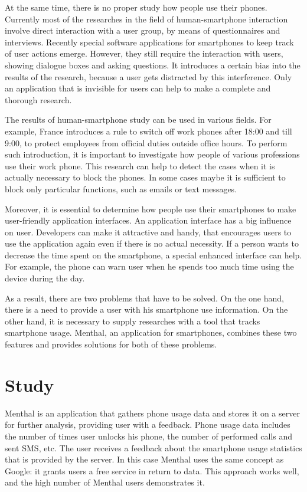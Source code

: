 At the same time, there is no proper study how people use their phones.
Currently most of the researches in the field of human-smartphone interaction involve direct interaction with a user group, by means of questionnaires and interviews.
Recently special software applications for smartphones to keep track of user actions emerge.
However, they still require the interaction with users, showing dialogue boxes and asking questions.
It introduces a certain bias into the results of the research, because a user gets distracted by this interference.
Only an application that is invisible for users can help to make a complete and thorough research.

The results of human-smartphone study can be used in various fields.
For example, France introduces a rule to switch off work phones after 18:00 and till 9:00, to protect employees from official duties outside office hours.
To perform such introduction, it is important to investigate how people of various professions use their work phone.
This research can help to detect the cases when it is actually necessary to block the phones.
In some cases maybe it is sufficient to block only particular functions, such as emails or text messages.

Moreover, it is essential to determine how people use their smartphones to make user-friendly application interfaces. 
An application interface has a big influence on user.
Developers can make it attractive and handy, that encourages users to use the application again even if there is no actual necessity.
If a person wants to decrease the time spent on the smartphone, a special enhanced interface can help.
For example, the phone can warn user when he spends too much time using the device during the day.  

As a result, there are two problems that have to be solved. 
On the one hand, there is a need to provide a user with his smartphone use information.
On the other hand, it is necessary to supply researches with a tool that tracks smartphone usage.
Menthal, an application for smartphones, combines these two features and provides solutions for both of these problems. 

\section{Study}
Menthal is an application that gathers phone usage data and stores it on a server for further analysis, providing user with a feedback.
Phone usage data includes the number of times user unlocks his phone, the number of performed calls and sent SMS, etc.
The user receives a feedback about the smartphone usage statistics that is provided by the server.
In this case Menthal uses the same concept as Google: it grants users a free service in return to data.
This approach works well, and the high number of Menthal users demonstrates it. 

